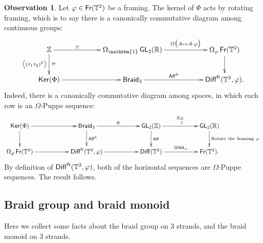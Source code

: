 \documentclass{amsart}
\theoremstyle{definition}
\newtheorem{observation}[theorem]{Observation}
\theoremstyle{remark}
\DeclareMathOperator{\Ker}{\sf Ker}
\DeclareMathOperator{\Diff}{{\sf Diff}}
\DeclareMathOperator{\fr}{\sf fr}
\def\ot{\otimes}
\newcommand{\lag}{\langle}
\newcommand{\rag}{\rangle}
\DeclareMathOperator{\uno}{\mathbbm{1}}
\DeclareMathOperator{\Braid}{{\sf Braid}_3}
\DeclareMathOperator{\GL}{\sf GL}
\DeclareMathOperator{\Fr}{\sf Fr}
\DeclareMathOperator{\Aff}{\sf Aff}
\begin{document}
\begin{observation}
\label{t43}
Let $\varphi \in \Fr(\TT^2)$ be a framing.
The kernel of $\Phi$ acts by rotating framing, which is to say 
there is a canonically commutative diagram among continuous groups:
\[
\xymatrix{
\ZZ
\ar[d]^-{\cong}_-{\bigl\lag (\tau_1\tau_2)^6 \bigr\rag}
\ar[rr]^-{\simeq}
&&
\Omega_{\uno} \GL_2(\RR)
\ar[rr]^-{\Omega \bigl( A\mapsto A \cdot \varphi \bigr)}
&&
\Omega_{\varphi} \Fr(\TT^2)
\ar[d]
\\
\Ker(\Phi)
\ar[rr]
&&
\Braid
\ar[rr]^-{\Aff^{\fr}}
&&
\Diff^{\fr}(\TT^2, \varphi)
.
}
\]
%
%
Indeed, there is a canonically commutative diagram among spaces, in which each row is an $\Omega$-Puppe sequence:
\[
\xymatrix{
\Ker(\Phi)
\ar[rr]
\ar[d]
&&
\Braid
\ar[rr]^-{\Phi}
\ar[d]^-{\Aff^{\fr}}
&&
\GL_2(\ZZ)
\ar[rr]^-{\RR\underset{\ZZ}\ot}
\ar[d]^-{\Aff}
&&
\GL_2(\RR)
\ar[d]^-{\rm Rotate~the~framing~\varphi}
\\
\Omega_{\varphi} \Fr(\TT^2)
\ar[rr]
&&
\Diff^{\fr}(\TT^2,\varphi)
\ar[rr]
&&
\Diff(\TT^2)
\ar[rr]^-{{\sf Orbit}_{\varphi}}
&&
\Fr(\TT^2)
.
}
\]
By definition of $\Diff^{\fr}(\TT^2,\varphi)$, both of the horizontal sequences are $\Omega$-Puppe sequences.
The result follows.  

\end{observation}











































\subsection{Braid group and braid monoid}
\label{sec.monoid}
Here we collect some facts about the braid group on 3 strands, and the braid monoid on 3 strands.
\end{document}
